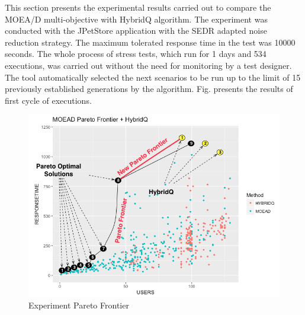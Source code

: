 \documentclass[espaco=umemeio,chapter=TITLE,twoside,openright]{abnt}
\begin{document}
This section presents the experimental results carried out to  compare the MOEA/D multi-objective with HybridQ algorithm. The experiment was conducted with the JPetStore application with the SEDR adapted  noise reduction strategy. The maximum tolerated response time in the test was 10000 seconds.  The whole process of stress  tests, which run for 1 days and 534 executions, was carried out without the need for monitoring by a test designer. The tool automatically selected the next scenarios to be run up to the limit of 15 previously established  generations by the algorithm. Fig. presents the results of first cycle of executions. 


\begin{figure}[h]
\centering
\includegraphics[width=1\textwidth]{./images/singlewithmulti.png}
    \caption{Experiment Pareto Frontier}
\label{fig:paretofrontier1}
\end{figure}










%
%
%
\end{document}
